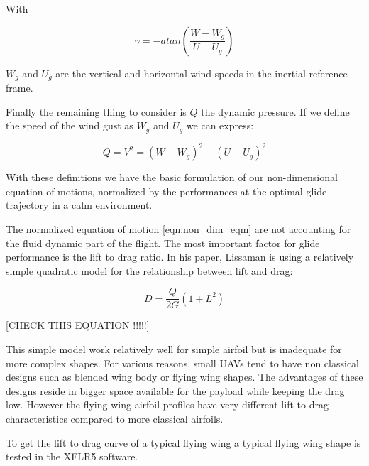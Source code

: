 With 

\begin{equation}
	\gamma = -atan(\frac{W-W_g}{U-U_g})
	\label{eqn:gamma_def}
\end{equation}

$W_g$ and $U_g$ are the vertical and horizontal wind speeds in the inertial reference frame.

\par Finally the remaining thing to consider is $Q$ the dynamic pressure. If we define the speed of the wind gust as $W_g$ and $U_g$ we can express:

\begin{equation}
	Q = V^2 = (W-W_g)^2 + (U-U_g)^2
	\label{eqn:q_def}
\end{equation}

\par With these definitions we have the basic formulation of our non-dimensional equation of motions, normalized by the performances at the optimal glide trajectory in a calm environment.


\par The normalized equation of motion \ref{eqn:non_dim_eqm} are not accounting for the fluid dynamic part of the flight.
The most important factor for glide performance is the lift to drag ratio. 
In his paper, Lissaman \cite{Lissaman2007neutral} is using a relatively simple quadratic model for the relationship between lift and drag:

\begin{equation}
	D=\frac{Q}{2G}(1+L^2)
	\label{eqn:Lissaman_G}
\end{equation}

[CHECK THIS EQUATION !!!!!]

\par This simple model work relatively well for simple airfoil but is inadequate for more complex shapes.
For various reasons, small UAVs tend to have non classical designs such as blended wing body or flying wing shapes.
The advantages of these designs reside in bigger space available for the payload while keeping the drag low.
However the flying wing airfoil profiles have very different lift to drag characteristics compared to more classical airfoils.

\par To get the lift to drag curve of a typical flying wing a typical flying wing shape is tested in the XFLR5 software.

